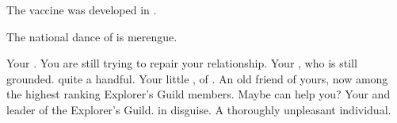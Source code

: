 \documentclass[char]{NeptuneBall}
\begin{document}
\begin{itemz}[Trivia]
  \item The \ppolio{} vaccine was developed in \pCity{}.
  \item The national dance of \pAtlantis{} is merengue.
\end{itemz}

\begin{contacts}
  \contact{\cKing{}} Your \cKing{\parent}. You are still trying to repair your relationship.
  \contact{\cWillow{}} Your \cWillow{\offspring}, who is still grounded. \cWillow{\They} \cWillow{\are} quite a handful.
  \contact{\cPrincess{}} Your little \cPrincess{\sibling}, \cPrincess{\prince} of \pAtlantis{}.
  \contact{\cPriest{}} An old friend of yours, now among the highest ranking Explorer's Guild members. Maybe \cPriest{\they} can help you?
  \contact{\cPlant{}} Your \cPlant{\uncle} and leader of the Explorer's Guild.
	\contact{\cWitch{\MYname}} \cWitch{} in disguise. A thoroughly unpleasant individual.
\end{contacts}
\end{document}
